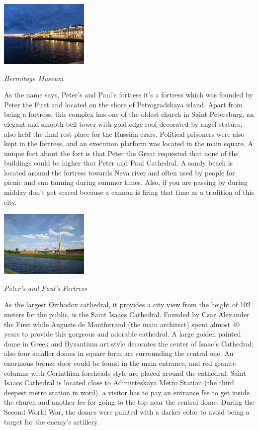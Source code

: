 \documentclass[10pt,a4paper]{article} %
\begin{document}
\begin{multicols}{3}
\begin{center}
\includegraphics[width=0.32\textwidth]{media/hermitage.jpg}
\par\textit{Hermitage Museum}
\end{center}

As the name says, Peter's and Paul's fortress it's a fortress which was founded 
by Peter the First and located on the shore of Petrogradskaya island. 
Apart from being a fortress, this complex has one of the oldest church in Saint Petersburg, 
an elegant and smooth bell tower with gold edge roof decorated by angel statues, 
also held the final rest place for the Russian czars. 
Political prisoners were also kept in the fortress, and an execution platform was 
located in the main square.
A unique fact about the fort is that Peter the Great requested that 
none of the buildings could be higher that Peter and Paul Cathedral. 
A sandy beach is located around the fortress towards Neva river and often used by people 
for picnic and sun tanning during summer times. 
Also, if you are passing by during midday don't get scared because a cannon is firing 
that time as a tradition of this city.

\begin{center}
	\includegraphics[width=0.32\textwidth]{media/peter_and_paul_fortress.jpg}
	\par\textit{Peter's and Paul's Fortress}
\end{center}

As the largest Orthodox cathedral, it provides a city view 
from the height of 102 meters for the public, is the Saint Isaacs Cathedral. 
Founded by Czar Alexander the First while Auguste de Montferrand (the main architect) 
spent almost 40 years to provide this gorgeous and adorable cathedral. 
A large golden painted dome in Greek and Byzantium art style decorates the 
center of Isaac's Cathedral; 
also four smaller domes in square form are surrounding the central one. 
An enormous bronze door could be found in the main entrance, and red granite columns 
with Corinthian foreheads style are placed around the cathedral. 
Saint Isaacs Cathedral is located close to Adimirteskaya Metro Station
(the third deepest metro station in word), 
a visitor has to pay an entrance fee to get inside the church and another 
fee for going to the top near the central dome. 
During the Second World War, the domes were painted with a darker color 
to avoid being a target for the enemy's artillery.


\end{multicols}
\end{document}

